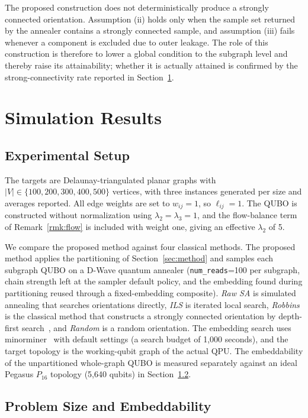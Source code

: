 \documentclass[twocolumn,a4paper]{article}
\begin{document}
The proposed construction does not deterministically produce a strongly connected orientation. Assumption (ii) holds only when the sample set returned by the annealer contains a strongly connected sample, and assumption (iii) fails whenever a component is excluded due to outer leakage. The role of this construction is therefore to lower a global condition to the subgraph level and thereby raise its attainability; whether it is actually attained is confirmed by the strong-connectivity rate reported in Section~\ref{sec:result}.

\section{Simulation Results} \label{sec:result}

\subsection{Experimental Setup}

The targets are Delaunay-triangulated planar graphs with \(|V|\in\{100,200,300,400,500\}\) vertices, with three instances generated per size and averages reported. All edge weights are set to \(w_{ij}=1\), so \(\ell_{ij}=1\). The QUBO is constructed without normalization using \(\lambda_2=\lambda_3=1\), and the flow-balance term of Remark~\ref{rmk:flow} is included with weight one, giving an effective \(\lambda_2\) of 5.

We compare the proposed method against four classical methods. The proposed method applies the partitioning of Section~\ref{sec:method} and samples each subgraph QUBO on a D-Wave quantum annealer (\texttt{num\_reads}=100 per subgraph, chain strength left at the sampler default policy, and the embedding found during partitioning reused through a fixed-embedding composite). \emph{Raw SA} is simulated annealing that searches orientations directly, \emph{ILS} is iterated local search, \emph{Robbins} is the classical method that constructs a strongly connected orientation by depth-first search~\cite{robbins1939theorem}, and \emph{Random} is a random orientation. The embedding search uses minorminer~\cite{cai2014practical} with default settings (a search budget of 1{,}000 seconds), and the target topology is the working-qubit graph of the actual QPU. The embeddability of the unpartitioned whole-graph QUBO is measured separately against an ideal Pegasus \(P_{16}\) topology (5{,}640 qubits) in Section~\ref{subsec:result_embed}.

\subsection{Problem Size and Embeddability} \label{subsec:result_embed}
\end{document}
